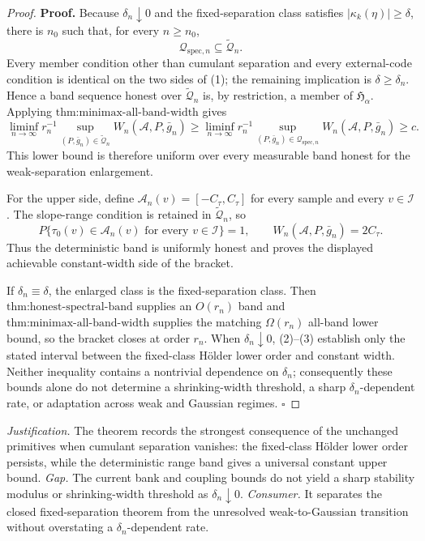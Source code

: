 \documentclass{article}
\begin{document}
\begin{proof}
\textbf{Proof.}
Because \(\delta_n\downarrow0\) and the fixed-separation class satisfies \(|\kappa_k(\eta)|\ge\delta\), there is \(n_0\) such that, for every \(n\ge n_0\),
\[
 \mathcal Q_{\mathrm{spec},n}\subseteq\widetilde{\mathcal Q}_n. \tag{1}
\]
Every member condition other than cumulant separation and every external-code condition is identical on the two sides of (1); the remaining implication is \(\delta\ge\delta_n\).  Hence a band sequence honest over \(\widetilde{\mathcal Q}_n\) is, by restriction, a member of \(\mathfrak H_\alpha\).  Applying \(\text{thm:minimax-all-band-width}\) gives
\[
 \liminf_{n\to\infty}r_n^{-1}
 \sup_{(P,\bar g_n)\in\widetilde{\mathcal Q}_n}
 W_n(\mathcal A,P,\bar g_n)
 \ge
 \liminf_{n\to\infty}r_n^{-1}
 \sup_{(P,\bar g_n)\in\mathcal Q_{\mathrm{spec},n}}
 W_n(\mathcal A,P,\bar g_n)
 \ge c. \tag{2}
\]
This lower bound is therefore uniform over every measurable band honest for the weak-separation enlargement.

For the upper side, define \(\mathcal A_n(v)=[-C_\tau,C_\tau]\) for every sample and every \(v\in\mathcal I\).  The slope-range condition is retained in \(\widetilde{\mathcal Q}_n\), so
\[
 P\{\tau_0(v)\in\mathcal A_n(v)\text{ for every }v\in\mathcal I\}=1,
 \qquad
 W_n(\mathcal A,P,\bar g_n)=2C_\tau. \tag{3}
\]
Thus the deterministic band is uniformly honest and proves the displayed achievable constant-width side of the bracket.

If \(\delta_n\equiv\delta\), the enlarged class is the fixed-separation class.  Then \(\text{thm:honest-spectral-band}\) supplies an \(O(r_n)\) band and \(\text{thm:minimax-all-band-width}\) supplies the matching \(\Omega(r_n)\) all-band lower bound, so the bracket closes at order \(r_n\).  When \(\delta_n\downarrow0\), (2)--(3) establish only the stated interval between the fixed-class Hölder lower order and constant width.  Neither inequality contains a nontrivial dependence on \(\delta_n\); consequently these bounds alone do not determine a shrinking-width threshold, a sharp \(\delta_n\)-dependent rate, or adaptation across weak and Gaussian regimes. \(\square\)
\end{proof}
\par\smallskip\noindent \textit{Justification.} The theorem records the strongest consequence of the unchanged primitives when cumulant separation vanishes: the fixed-class Hölder lower order persists, while the deterministic range band gives a universal constant upper bound. \textit{Gap.} The current bank and coupling bounds do not yield a sharp stability modulus or shrinking-width threshold as \(\delta_n\downarrow0\). \textit{Consumer.} It separates the closed fixed-separation theorem from the unresolved weak-to-Gaussian transition without overstating a \(\delta_n\)-dependent rate.
\end{document}
